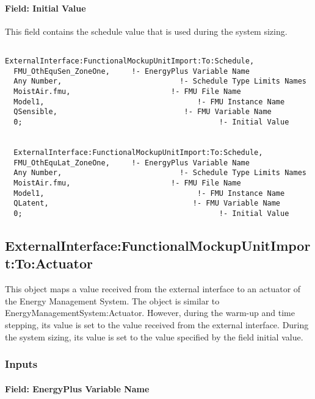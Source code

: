 \paragraph{Field: Initial Value}\label{field-initial-value-3}

This field contains the schedule value that is used during the system sizing.

\begin{lstlisting}

ExternalInterface:FunctionalMockupUnitImport:To:Schedule,
  FMU_OthEquSen_ZoneOne,     !- EnergyPlus Variable Name
  Any Number,                           !- Schedule Type Limits Names
  MoistAir.fmu,                       !- FMU File Name
  Model1,                                   !- FMU Instance Name
  QSensible,                             !- FMU Variable Name
  0;                                             !- Initial Value


  ExternalInterface:FunctionalMockupUnitImport:To:Schedule,
  FMU_OthEquLat_ZoneOne,     !- EnergyPlus Variable Name
  Any Number,                           !- Schedule Type Limits Names
  MoistAir.fmu,                       !- FMU File Name
  Model1,                                   !- FMU Instance Name
  QLatent,                                 !- FMU Variable Name
  0;                                             !- Initial Value
\end{lstlisting}

\subsection{ExternalInterface:FunctionalMockupUnitImport:To:Actuator}\label{externalinterfacefunctionalmockupunitimporttoactuator}

This object maps a value received from the external interface to an actuator of the Energy Management System. The object is similar to EnergyManagementSystem:Actuator. However, during the warm-up and time stepping, its value is set to the value received from the external interface. During the system sizing, its value is set to the value specified by the field initial value.

\subsubsection{Inputs}\label{inputs-7-009}

\paragraph{Field: EnergyPlus Variable Name}\label{field-energyplus-variable-name-2}

